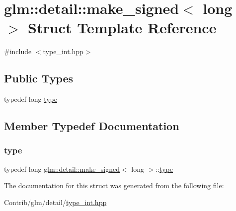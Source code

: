 \hypertarget{structglm_1_1detail_1_1make__signed_3_01long_01_4}{}\section{glm\+:\+:detail\+:\+:make\+\_\+signed$<$ long $>$ Struct Template Reference}
\label{structglm_1_1detail_1_1make__signed_3_01long_01_4}


{\ttfamily \#include $<$type\+\_\+int.\+hpp$>$}

\subsection*{Public Types}
\begin{DoxyCompactItemize}
\item 
typedef long \mbox{\hyperlink{structglm_1_1detail_1_1make__signed_3_01long_01_4_ab9807f0a681192166dd820195c967222}{type}}
\end{DoxyCompactItemize}


\subsection{Member Typedef Documentation}
\mbox{\label{structglm_1_1detail_1_1make__signed_3_01long_01_4_ab9807f0a681192166dd820195c967222}} 
\subsubsection{\texorpdfstring{type}{type}}
{\footnotesize\ttfamily typedef long \mbox{\hyperlink{structglm_1_1detail_1_1make__signed}{glm\+::detail\+::make\+\_\+signed}}$<$ long $>$\+::\mbox{\hyperlink{structglm_1_1detail_1_1make__signed_3_01long_01_4_ab9807f0a681192166dd820195c967222}{type}}}



The documentation for this struct was generated from the following file\+:\begin{DoxyCompactItemize}
\item 
Contrib/glm/detail/\mbox{\hyperlink{type__int_8hpp}{type\+\_\+int.\+hpp}}\end{DoxyCompactItemize}
